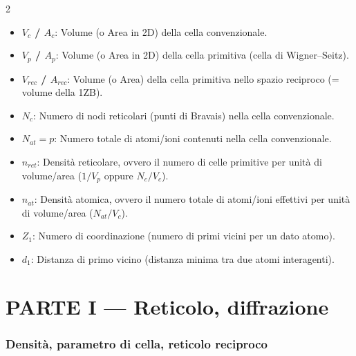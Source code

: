 \begin{landscape}
\vspace{0.3cm}
\begin{multicols}{2}
    \begin{itemize}
    \setlength{\itemsep}{3pt}
        \item \textbf{$V_c$ / $A_c$}: Volume (o Area in 2D) della cella convenzionale.
        \item \textbf{$V_p$ / $A_p$}: Volume (o Area in 2D) della cella primitiva (cella di Wigner--Seitz).
        \item \textbf{$V_{rec}$ / $A_{rec}$}: Volume (o Area) della cella primitiva nello spazio reciproco (= volume della 1ZB).
        \item \textbf{$N_c$}: Numero di nodi reticolari (punti di Bravais) nella cella convenzionale.
        \item \textbf{$N_{at} =p$}: Numero totale di atomi/ioni contenuti nella cella convenzionale.
        \item \textbf{$n_{ret}$}: Densità reticolare, ovvero il numero di celle primitive per unità di volume/area ($1/V_p$ oppure $N_c/V_c$).
        \item \textbf{$n_{at}$}: Densità atomica, ovvero il numero totale di atomi/ioni effettivi per unità di volume/area ($N_{at}/V_c$).
        \item \textbf{$Z_1$}: Numero di coordinazione (numero di primi vicini per un dato atomo).
        \item \textbf{$d_1$}: Distanza di primo vicino (distanza minima tra due atomi interagenti).
    \end{itemize}
\end{multicols}
\end{landscape}


\newpage
\part*{\centering PARTE I --- Reticolo, diffrazione}
\vspace{-0.3cm}

\section{Densità, parametro di cella, reticolo reciproco}


